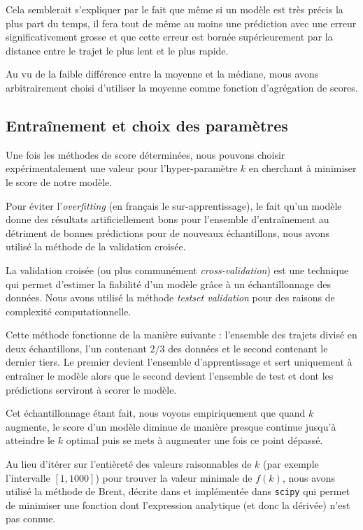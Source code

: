 \documentclass[letterpaper]{article}
\begin{document}
Cela semblerait s'expliquer par le fait que même si un modèle est très précis la plus part du temps, il fera tout de même au moins une prédiction avec une erreur significativement grosse et que cette erreur est bornée supérieurement par la distance entre le trajet le plus lent et le plus rapide.

Au vu de la faible différence entre la moyenne et la médiane, mous avons arbitrairement choisi d'utiliser la moyenne comme fonction d'agrégation de scores.

\subsection{Entraînement et choix des paramètres}

Une fois les méthodes de score déterminées, nous pouvons choisir expérimentalement une valeur pour l'hyper-paramètre $k$ en cherchant à minimiser le score de notre modèle.

Pour éviter l'\textit{overfitting} (en français le sur-apprentissage), le fait qu'un modèle donne des résultats artificiellement bons pour l'ensemble d’entraînement au détriment de bonnes prédictions pour de nouveaux échantillons, nous avons utilisé la méthode de la validation croisée.

La validation croisée (ou plus communément \textit{cross-validation}) est une technique qui permet d'estimer la fiabilité d'un modèle grâce à un échantillonnage des données. Nous avons utilisé la méthode \textit{testset validation} pour des raisons de complexité computationnelle.

Cette méthode fonctionne de la manière suivante : l'ensemble des trajets divisé en deux échantillons, l'un contenant $2/3$ des données et le second contenant le dernier tiers. Le premier devient l'ensemble d'apprentissage et sert uniquement à entraîner le modèle alors que le second devient l'ensemble de test et dont les prédictions serviront à scorer le modèle.

Cet échantillonnage étant fait, nous voyons empiriquement que quand $k$ augmente, le score d'un modèle diminue de manière presque continue jusqu'à atteindre le $k$ optimal puis se mets à augmenter une fois ce point dépassé.

Au lieu d'itérer sur l'entièreté des valeurs raisonnables de $k$ (par exemple l’intervalle $[1,1000]$) pour trouver la valeur minimale de $f(k)$, nous avons utilisé la méthode de Brent, décrite dans \cite{rivlin1973algorithms} et implémentée dans \texttt{scipy} qui permet de minimiser une fonction dont l'expression analytique (et donc la dérivée) n'est pas connue.
\end{document}
